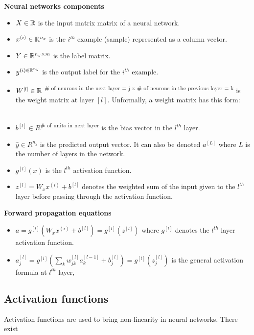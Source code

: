 \noindent \textbf{Neural networks components}
\begin{itemize}
\item $X\in \mathbb{R}$ is the input matrix matrix of a neural network.
\item $x^{(i)} \in \mathbb{R}^{n_{x}}$ is the $i^{th}$ example (sample) represented as a column vector.
\item $Y \in \mathbb{R}^{n_{y} \times m}$ is the label matrix.
\item $y^{(i) \in \mathbb{R}^{n_{y}}}$ is the output label for the $i^{th}$ example.
\item $W^{[l]} \in \mathbb{R}$ \textsuperscript{\# of neurons in the next layer = j  x \# of neurons in the previous layer = k} is the weight matrix at layer $[l]$. Unformally, a weight matrix has this form:\\\\



\item $b^{[l]} \in R$\textsuperscript{\# of units in next layer} is the bias vector in the $l^{th}$ layer.
\item $\hat{y} \in R^{n_{y}}$ is the predicted output vector. It can also be denoted $a^{[L]}$ where $L$ is the number of layers in the network.
\item $g^{[l]}(x)$ is the $l^{th}$ activation function.  
\item $z^{[l]} = W_{x}x^{(i)} + b^{[l]}$ denotes the weighted sum of the input given to the $l^{th}$ layer before passing through the activation function.\\
\end{itemize}

\noindent \textbf{Forward propagation equations}
\begin{itemize}
\item $a = g^{[l]}(W_{x}x^{(i)} + b^{[l]}) = g^{[l]}(z^{[l]})$ where $g^{[l]}$ denotes the $l^{th}$ layer activation function.
\item $a_{j}^{[l]} = g^{[l]} (\sum_{k} w_{jk}^{[l]}a_{k}^{[l-1]} + b_{j}^{[l]}) = g^{[l]} (z_{j}^{[l]}) $ is the general activation formula at $l^{th}$ layer, 
\end{itemize}


\subsection{Activation functions}
\label{activation_functions}
Activation functions are used to bring non-linearity in neural networks. There exist 




